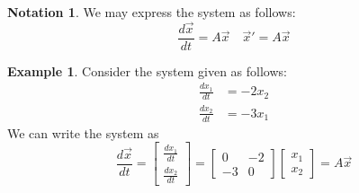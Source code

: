 \documentclass[11pt]{amsart}
\theoremstyle{definition}\newtheorem{definition}{Definition}
\theoremstyle{definition}\newtheorem{notation}{Notation}
\theoremstyle{definition}\newtheorem{example}{Example}
\theoremstyle{theorem}\newtheorem{theorem}{Theorem}
\theoremstyle{theorem}\newtheorem{corollary}{Corollary}
\theoremstyle{theorem}\newtheorem{proposition}{Proposition}
\theoremstyle{theorem}\newtheorem{lemma}{Lemma}
\theoremstyle{theorem}\newtheorem{question}{Question}
\theoremstyle{remark}\newtheorem{remark}{Remark}
\begin{document}
\begin{notation}
    We may express the system as follows:
    \begin{equation*}
        \frac{d\vec{x}}{dt} = A\vec{x} \quad \vec{x}' = A\vec{x}
    \end{equation*}
\end{notation}

\begin{example}
    Consider the system given as follows:
    \begin{align*}
        \frac{dx_1}{dt} &= -2x_2 \\
        \frac{dx_2}{dt} &= -3x_1
    \end{align*}
    We can write the system as
    \begin{equation*}
        \frac{d\vec{x}}{dt} = \begin{bmatrix} \frac{dx_1}{dt} \\ \frac{dx_2}{dt} \end{bmatrix} = \begin{bmatrix} 0 & -2 \\ -3 & 0 \end{bmatrix} \begin{bmatrix} x_1 \\ x_2 \end{bmatrix} = A\vec{x}
    \end{equation*}
\end{example}
\end{document}
